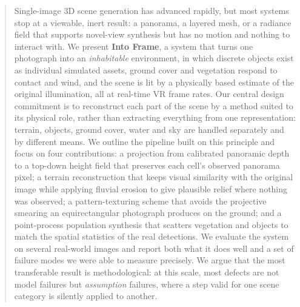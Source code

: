 \begin{abstract}
\noindent
Single-image 3D scene generation has advanced rapidly, but most systems stop at a
viewable, inert result: a panorama, a layered mesh, or a radiance field that
supports novel-view synthesis but has no motion and nothing to interact with.
We present \textbf{Into Frame}, a system that turns one photograph into an
\emph{inhabitable} environment, in which discrete objects exist as individual
simulated assets, ground cover and vegetation respond to contact and wind, and
the scene is lit by a physically based estimate of the original illumination, all
at real-time VR frame rates.
Our central design commitment is to reconstruct each part of the scene by a
method suited to its physical role, rather than extracting everything from one
representation: terrain, objects, ground cover, water and sky are handled
separately and by different means.
We outline the pipeline built on this principle and focus on four contributions:
a projection from calibrated panoramic depth to a top-down height field that
preserves each cell's observed panorama pixel; a terrain reconstruction that
keeps visual similarity with the original image while applying fluvial erosion to
give plausible relief where nothing was observed; a pattern-texturing scheme that
avoids the projective smearing an equirectangular photograph produces on the
ground; and a point-process population synthesis that scatters vegetation and
objects to match the spatial statistics of the real detections.
We evaluate the system on several real-world images and report both what it does
well and a set of failure modes we were able to measure precisely. We argue that
the most transferable result is methodological: at this scale, most defects are
not model failures but \emph{assumption} failures, where a step valid for one
scene category is silently applied to another.
\end{abstract}
